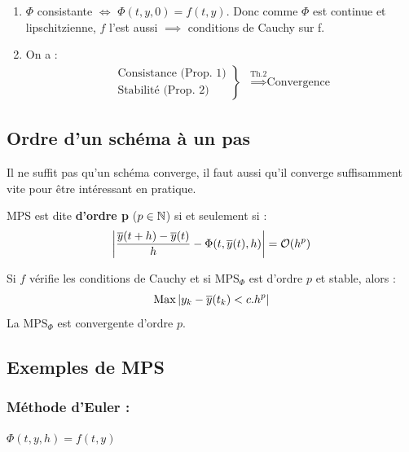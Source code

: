 \begin{preuve}
    \begin{enumerate}[label=(\roman*)]
        \item  $\Phi$ consistante $\iff$ $\Phi(t,y,0) = f(t,y)$. Donc comme $\Phi$ est continue et
            lipschitzienne, $f$ l'est aussi $\implies$ conditions de Cauchy sur f.

            \vspace{0.5cm}
        \item On a :
            \[
                \begin{array}{cc}
                    \left.
                    \begin{array}{c}
                        \text{Consistance (Prop. 1)} \\
                        \text{Stabilité (Prop. 2)}
                    \end{array}
                    \right\rbrace
                    &
                    \overset{\text{Th.2}}{\implies}
                    \text{Convergence}
                \end{array}
            \]
    \end{enumerate}
\end{preuve}

\subsection{Ordre d'un schéma à un pas}
Il ne suffit pas qu'un schéma converge, il faut aussi qu'il converge suffisamment vite pour être
intéressant en pratique.

\begin{fdef}
    MPS est dite \textbf{d'ordre p} ($p \in \mathbb{N}$) si et seulement si :
    \[
        \left\lvert\frac{\overline{y}(t+h) - \overline{y}(t)}{h} - \Phi(t,\overline{y}(t),h)\right\rvert = \mathcal{O} (h^p)
    \]
\end{fdef}

\begin{ftheo}
    Si $f$ vérifie les conditions de Cauchy et si $\text{MPS}_\Phi$ est d'ordre $p$ et stable, alors :
    \[
        \operatorname{Max} \left\lvert y_k - \overline{y}(t_k) < c . h^p\right\rvert
    \]
    La $\text{MPS}_\Phi$ est convergente d'ordre $p$.
\end{ftheo}

\subsection{Exemples de MPS}
\subsubsection*{Méthode d'Euler :}
$\Phi(t,y,h) = f(t,y)$

